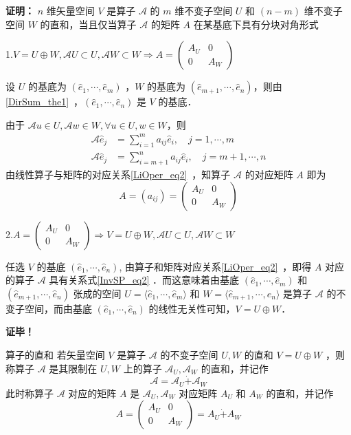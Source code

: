 \textbf{证明：}
$n$ 维矢量空间 $V$ 是算子 $\mathcal{A}$ 的 $m$ 维不变子空间 $U$ 和 $(n-m)$ 维不变子空间 $W$ 的直和，当且仅当算子 $\mathcal{A}$ 的矩阵 $A$ 在某基底下具有分块对角形式

1.$
V=U\oplus W,\mathcal{A}U\subset U,\mathcal{A}W\subset W\Rightarrow A=\begin{pmatrix}
A_U&0\\
0&A_W
\end{pmatrix}
$

设 $U$ 的基底为 $(\hat e_1,\cdots,\hat e_m)$ ，$W$ 的基底为 $(\hat e_{m+1},\cdots,\hat e_n)$，则由\autoref{DirSum_the1}~，$(\hat e_{1},\cdots,\hat e_n)$ 是 $V$ 的基底．

由于 $\mathcal{A}u\in U, \mathcal{A} w\in W,\forall  u\in U, w\in W$，则
\begin{equation}\label{InvSP_eq2}
\begin{aligned}
\mathcal{A}\hat e_j&=\sum_{i=1}^m a_{ij}\hat e_i,\quad j=1,\cdots ,m\\
\mathcal{A}\hat e_j&=\sum_{i=m+1}^n a_{ij}\hat e_i,\quad j=m+1,\cdots ,n
\end{aligned}
\end{equation}
由线性算子与矩阵的对应关系\autoref{LiOper_eq2}~，知算子 $\mathcal{A}$ 的对应矩阵 $A$ 即为 
\begin{equation}
A=(a_{ij})=\begin{pmatrix}
A_U&0\\
0&A_W
\end{pmatrix}
\end{equation}

2.$
A=\begin{pmatrix}
A_U&0\\
0&A_W
\end{pmatrix}\Rightarrow V=U\oplus W,\mathcal{A}U\subset U,\mathcal{A}W\subset W
$

任选 $V$ 的基底 $(\hat e_1,\cdots,\hat e_n)$, 由算子和矩阵对应关系\autoref{LiOper_eq2}~，即得 $A$ 对应的算子 $\mathcal{A}$ 具有关系式\autoref{InvSP_eq2} ．而这意味着由基底 $(\hat e_1,\cdots,\hat e_m)$ 和 $(\hat e_{m+1},\cdots,\hat e_n)$ 张成的空间 $U=\langle\hat e_1,\cdots,\hat e_m\rangle$ 和 $W=\langle\hat e_{m+1},\cdots,\hat e_n\rangle$ 是算子 $\mathcal{A}$ 的不变子空间，而由基底 $(\hat e_1,\cdots,\hat e_n)$ 的线性无关性可知，$V=U\oplus W$．

\textbf{证毕！}


\begin{definition}{算子的直和}
若矢量空间 $V$ 是算子 $\mathcal{A}$ 的不变子空间 $U,W$ 的直和 $V=U\oplus W$ ，则称算子 $\mathcal{A}$ 是其限制在 $U,W$ 上的算子 $\mathcal{A}_U,\mathcal{A}_W$ 的直和，并记作
\begin{equation}
\mathcal{A}=\mathcal{A}_U\dot{+}\mathcal{A}_W
\end{equation}
此时称算子 $\mathcal{A}$ 对应的矩阵 $A$ 是 $\mathcal{A}_U,\mathcal{A}_W$ 对应矩阵 $A_U$ 和 $A_W$ 的直和，并记作
\begin{equation}
A=\begin{pmatrix}
A_U&0\\
0&A_W
\end{pmatrix}=A_U\dot{+}A_W
\end{equation}

\end{definition}